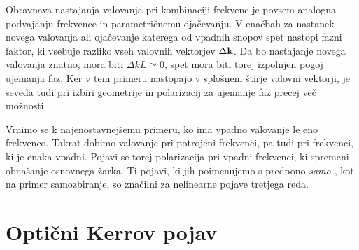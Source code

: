 Obravnava nastajanja valovanja pri
kombinaciji frekvenc je povsem analogna podvajanju frekvence in parametričnemu
ojačevanju. V enačbah za nastanek novega valovanja ali ojačevanje
katerega od vpadnih snopov spet nastopi fazni faktor, ki vsebuje razliko
vseh valovnih vektorjev $\Delta{\bf k}$. Da bo nastajanje novega
valovanja znatno, mora biti $\Delta kL\simeq0$, spet mora biti torej
izpolnjen pogoj ujemanja faz. Ker v tem primeru nastopajo v splošnem štirje
valovni vektorji, je seveda tudi pri izbiri geometrije in polarizacij
za ujemanje faz precej več možnosti.

Vrnimo se k najenostavnejšemu primeru, ko ima vpadno valovanje le eno 
frekvenco. Takrat dobimo valovanje pri potrojeni frekvenci, pa tudi
pri frekvenci, ki je enaka vpadni. Pojavi se torej polarizacija pri 
vpadni frekvenci, ki spremeni obnašanje osnovnega žarka. Ti pojavi, ki 
jih poimenujemo s predpono {\it samo-}, kot na primer samozbiranje, so
značilni za nelinearne pojave tretjega reda. 

\section{Optični Kerrov pojav}

